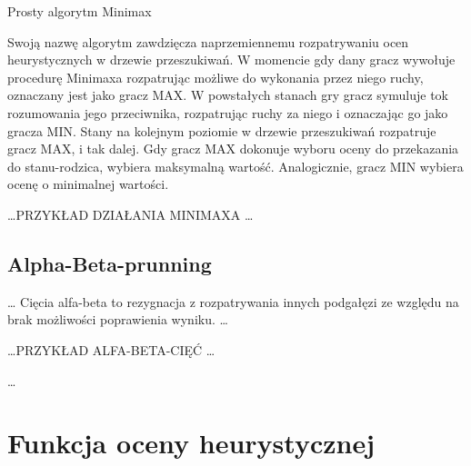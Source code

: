 {\small
\begin{pseudokod}[H]
\caption{Prosty algorytm Minimax}\label{alg:mine}
\end{pseudokod}
}

Swoją nazwę algorytm zawdzięcza naprzemiennemu rozpatrywaniu ocen heurystycznych w drzewie przeszukiwań. W momencie gdy dany gracz wywołuje procedurę Minimaxa rozpatrując możliwe do wykonania przez niego ruchy, oznaczany jest jako gracz MAX. W powstałych stanach gry gracz symuluje tok rozumowania jego przeciwnika, rozpatrując ruchy za niego i oznaczając go jako gracza MIN. Stany na kolejnym poziomie w drzewie przeszukiwań rozpatruje gracz MAX, i tak dalej. Gdy gracz MAX dokonuje wyboru oceny do przekazania do stanu-rodzica, wybiera maksymalną wartość. Analogicznie, gracz MIN wybiera ocenę o minimalnej wartości.

\ldots PRZYKŁAD DZIAŁANIA MINIMAXA \ldots

\subsection{Alpha-Beta-prunning}

\ldots
Cięcia alfa-beta to rezygnacja z rozpatrywania innych podgałęzi ze względu na brak możliwości poprawienia wyniku. \ldots

\ldots PRZYKŁAD ALFA-BETA-CIĘĆ \ldots

\ldots

\section{Funkcja oceny heurystycznej}

